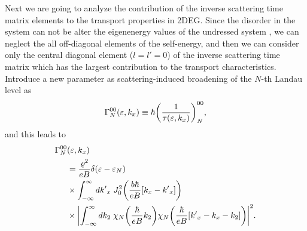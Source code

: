 Next we are going to analyze the contribution of the inverse scattering time matrix elements to the transport properties in 2DEG.
Since the disorder in the system can not be alter the eigenenergy values of the undressed system \cite{wackerl20}, we can neglect the all off-diagonal elements of the self-energy, and then we can consider only the central diagonal element (${l=l'=0}$) of the inverse scattering time matrix which has the largest contribution to the transport characteristics.
Introduce a new parameter as scattering-induced broadening of the $N$-th Landau level as \cite{dini16,endo09}
\begin{equation} \label{eq_14}
 \Gamma^{00}_{N}(\varepsilon,k_x) \equiv \hbar \qty(\frac{1}{\tau(\varepsilon,k_x)})^{00}_{N},
\end{equation}
and this leads to
\begin{equation} \label{eq_15}
 \begin{aligned}
   \Gamma^{00}_{N}& (\varepsilon,k_x) \\
   & =
   \frac { \varrho^2}{eB}
   \delta(\varepsilon - \varepsilon_{N}) \\
   & \times
   \int_{-\infty}^{\infty} d {k'}_x \;
   J_0^2\qty(\frac{b\hbar}{eB}[{k}_x - {k'}_x])
   \\
   & \times
   \qty|
   \int_{-\infty}^{\infty} dk_2 \;
   {\chi}_{N}\qty(\frac{\hbar}{eB}k_2)
   {\chi}_{N}\qty(\frac{\hbar}{eB} \qty[{k'}_x - {k}_x - k_2])|^2.
 \end{aligned}
\end{equation}

